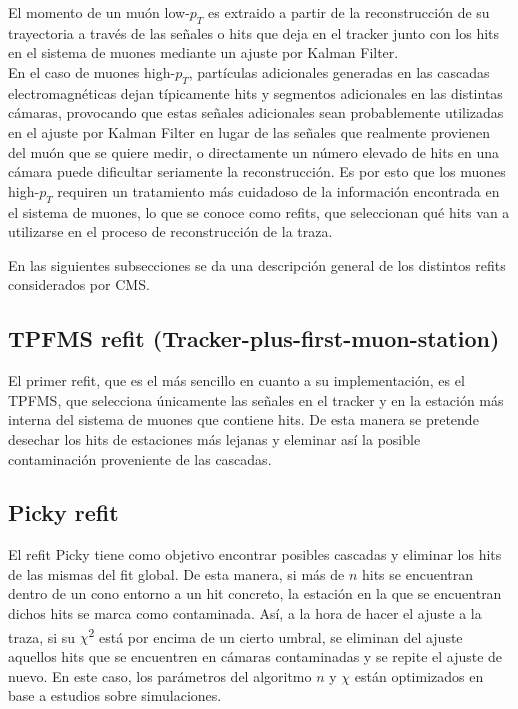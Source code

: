 
El momento de un mu\'on low-$p_{T}$ es extraido a partir de la reconstrucci\'on de su trayectoria a trav\'es de las señales o hits que deja en el tracker junto con los hits en el sistema de muones mediante un ajuste por Kalman Filter. \\

En el caso de muones high-$p_{T}$, part\'iculas adicionales generadas en las cascadas electromagn\'eticas dejan t\'ipicamente hits y segmentos adicionales en las distintas c\'amaras, provocando que estas señales adicionales sean probablemente utilizadas en el ajuste por Kalman Filter en lugar de las señales que realmente provienen del mu\'on que se quiere medir, o directamente un n\'umero elevado de hits en una c\'amara puede dificultar seriamente la reconstrucci\'on. Es por esto que los muones high-$p_{T}$ requiren un tratamiento m\'as cuidadoso de la informaci\'on encontrada en el sistema de muones, lo que se conoce como refits, que seleccionan qu\'e hits van a utilizarse en el proceso de reconstrucci\'on de la traza. 

En las siguientes subsecciones se da una descripci\'on general de los distintos refits considerados por CMS.

\subsection{TPFMS refit (Tracker-plus-first-muon-station)}\label{sec:TPFMS}

El primer refit, que es el m\'as sencillo en cuanto a su implementaci\'on, es el TPFMS, que selecciona \'unicamente las señales en el tracker y en la estaci\'on m\'as interna del sistema de muones que contiene hits. De esta manera se pretende desechar los hits de estaciones m\'as lejanas y eleminar as\'i la posible contaminaci\'on proveniente de las cascadas.

\subsection{Picky refit}\label{sec:Picky}

El refit Picky tiene como objetivo encontrar posibles cascadas y eliminar los hits de las mismas del fit global. De esta manera, si m\'as de $n$ hits se encuentran dentro de un cono entorno a un hit concreto, la estaci\'on en la que se encuentran dichos hits se marca como contaminada. As\'i, a la hora de hacer el ajuste a la traza, si su $\chi$\textsuperscript{2} est\'a por encima de un cierto umbral, se eliminan del ajuste aquellos hits que se encuentren en c\'amaras contaminadas y se repite el ajuste de nuevo. En este caso, los par\'ametros del algoritmo $n$ y $\chi$ est\'an optimizados en base a estudios sobre simulaciones.

